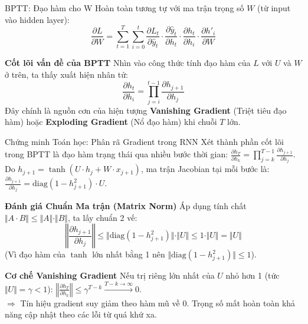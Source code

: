 \documentclass[aspectratio=169, 10pt]{beamer}
\begin{document}
\begin{frame}{BPTT: Đạo hàm cho W}
\small
Hoàn toàn tương tự với ma trận trọng số $W$ (từ input vào hidden layer):
\[ \frac{\partial L}{\partial W} = \sum_{t=1}^{T} \sum_{i=0}^{t} \frac{\partial L_t}{\partial \hat{y}_t} \cdot \frac{\partial \hat{y}_t}{\partial h_t} \cdot \frac{\partial h_t}{\partial h_i} \cdot \frac{\partial h'_i}{\partial W} \]

\vspace{0.4cm}
\begin{alertblock}{\textbf{Cốt lõi vấn đề của BPTT}}
Nhìn vào công thức tính đạo hàm của $L$ với $U$ và $W$ ở trên, ta thấy xuất hiện nhân tử:
\[ \frac{\partial h_t}{\partial h_i} = \prod_{j=i}^{t-1} \frac{\partial h_{j+1}}{\partial h_j} \]
Đây chính là nguồn cơn của hiện tượng \textbf{Vanishing Gradient} (Triệt tiêu đạo hàm) hoặc \textbf{Exploding Gradient} (Nổ đạo hàm) khi chuỗi $T$ lớn.
\end{alertblock}
\end{frame}

\begin{frame}{Chứng minh Toán học: Phân rã Gradient trong RNN}
\footnotesize
Xét thành phần cốt lõi trong BPTT là đạo hàm trạng thái qua nhiều bước thời gian: $\frac{\partial h_T}{\partial h_k} = \prod_{j=k}^{T-1} \frac{\partial h_{j+1}}{\partial h_j}$.\\[0.1cm]
Do $h_{j+1} = \tanh(U \cdot h_j + W \cdot x_{j+1})$, ma trận Jacobian tại mỗi bước là: $\frac{\partial h_{j+1}}{\partial h_j} = \text{diag}(1 - h_{j+1}^2) \cdot U$.

\vspace{0.05cm}
\begin{block}{\textbf{Đánh giá Chuẩn Ma trận (Matrix Norm)}}
Áp dụng tính chất $\Vert A \cdot B \Vert \le \Vert A \Vert \cdot \Vert B \Vert$, ta lấy chuẩn 2 vế:
\[ \left\Vert \frac{\partial h_{j+1}}{\partial h_j} \right\Vert \le \Vert \text{diag}(1 - h_{j+1}^2) \Vert \cdot \Vert U \Vert \le 1 \cdot \Vert U \Vert = \Vert U \Vert \]
(Vì đạo hàm của $\tanh$ lớn nhất bằng 1 nên $\Vert \text{diag}(1 - h_{j+1}^2) \Vert \le 1$).
\end{block}

\vspace{0.05cm}
\begin{alertblock}{\textbf{Cơ chế Vanishing Gradient}}
Nếu trị riêng lớn nhất của $U$ nhỏ hơn 1 (tức $\Vert U \Vert = \gamma < 1$): $\left\Vert \frac{\partial h_T}{\partial h_k} \right\Vert \le \gamma^{T-k} \xrightarrow{T-k \to \infty} 0$.\\[0.1cm]
$\Rightarrow$ Tín hiệu gradient suy giảm theo hàm mũ về 0. Trọng số mất hoàn toàn khả năng cập nhật theo các lỗi từ quá khứ xa.
\end{alertblock}
\end{frame}
\end{document}

